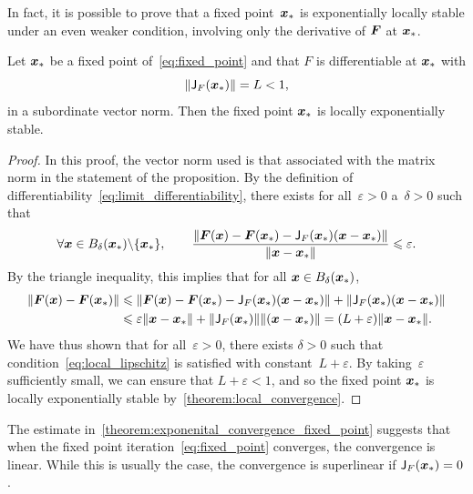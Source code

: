 In fact, it is possible to prove that a fixed point~$\mathbf{\boldsymbol{x}}_*$ is exponentially locally stable under an even weaker condition,
involving only the derivative of $\mathbf{\boldsymbol{F}}$ at $\mathbf{\boldsymbol{x}}_*$.
\begin{proposition}
    \label{proposition:local_convergence}
    Let $\mathbf{\boldsymbol{x}}_*$ be a fixed point of~\eqref{eq:fixed_point} and that $F$ is differentiable at $\mathbf{\boldsymbol{x}}_*$ with
    \[
        \lVert\mathsf J_F(\mathbf{\boldsymbol{x}}_*)\rVert = L < 1,
    \]
    in a subordinate vector norm.
    Then  the fixed point $\mathbf{\boldsymbol{x}}_*$ is locally exponentially stable.
\end{proposition}
\begin{proof}
    In this proof, the vector norm used is that associated with the matrix norm in the statement of the proposition.
    By the definition of differentiability~\eqref{eq:limit_differentiability},
    there exists for all~$\varepsilon > 0$ a~$\delta > 0$ such that
    \[
        \forall \mathbf{\boldsymbol{x}} \in B_{\delta} (\mathbf{\boldsymbol{x}}_*) \backslash \{ \mathbf{\boldsymbol{x}}_* \}, \qquad
        \frac{\lVert\mathbf{\boldsymbol{F}}(\mathbf{\boldsymbol{x}}) - \mathbf{\boldsymbol{F}}(\mathbf{\boldsymbol{x}}_*) - \mathsf J_F(\mathbf{\boldsymbol{x}}_*)(\mathbf{\boldsymbol{x}} - \mathbf{\boldsymbol{x}}_*)\rVert}{\lVert\mathbf{\boldsymbol{x}} - \mathbf{\boldsymbol{x}}_*\rVert} \leqslant \varepsilon.
    \]
    By the triangle inequality,
    this implies that for all $\mathbf{\boldsymbol{x}} \in B_{\delta} (\mathbf{\boldsymbol{x}}_*)$,
    \begin{align*}
        \lVert\mathbf{\boldsymbol{F}}(\mathbf{\boldsymbol{x}}) - \mathbf{\boldsymbol{F}}(\mathbf{\boldsymbol{x}}_*)\rVert
        &\leqslant
        \lVert\mathbf{\boldsymbol{F}}(\mathbf{\boldsymbol{x}}) - \mathbf{\boldsymbol{F}}(\mathbf{\boldsymbol{x}}_*) - \mathsf J_F(\mathbf{\boldsymbol{x}}_*)(\mathbf{\boldsymbol{x}} - \mathbf{\boldsymbol{x}}_*)\rVert + \lVert\mathsf J_F(\mathbf{\boldsymbol{x}}_*)(\mathbf{\boldsymbol{x}} - \mathbf{\boldsymbol{x}}_*)\rVert \\
        &\leqslant
        \varepsilon \lVert\mathbf{\boldsymbol{x}} - \mathbf{\boldsymbol{x}}_*\rVert + \lVert\mathsf J_F(\mathbf{\boldsymbol{x}}_*)\rVert \lVert(\mathbf{\boldsymbol{x}} - \mathbf{\boldsymbol{x}}_*)\rVert
        = (L + \varepsilon) \lVert\mathbf{\boldsymbol{x}} - \mathbf{\boldsymbol{x}}_*\rVert.
    \end{align*}
    We have thus shown that for all~$\varepsilon > 0$,
    there exists $\delta > 0$ such that condition~\eqref{eq:local_lipschitz} is satisfied with constant~$L+\varepsilon$.
    By taking~$\varepsilon$ sufficiently small,
    we can ensure that $L + \varepsilon < 1$,
    and so the fixed point $\mathbf{\boldsymbol{x}}_*$ is locally exponentially stable by~\cref{theorem:local_convergence}.
\end{proof}

The estimate in~\cref{theorem:exponenital_convergence_fixed_point} suggests that
when the fixed point iteration~\eqref{eq:fixed_point} converges,
the convergence is linear.
While this is usually the case,
the convergence is superlinear if $\mathsf J_F(\mathbf{\boldsymbol{x}}_*) = 0$.


